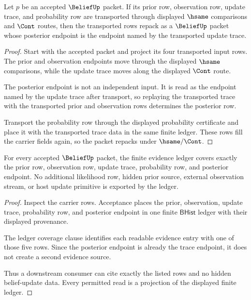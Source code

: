 \begin{theorem}
\label{thm:belief-posterior-trace-transport-obligation}
Let $p$ be an accepted $\BeliefUp$ packet. If its prior row, observation row,
update trace, and probability row are transported through displayed $\hsame$
comparisons and $\Cont$ routes, then the transported rows repack as a
$\BeliefUp$ packet whose posterior endpoint is the endpoint named by the
transported update trace.
\end{theorem}
\begin{proof}
Start with the accepted packet and project its four transported input rows. The
prior and observation endpoints move through the displayed $\hsame$ comparisons,
while the update trace moves along the displayed $\Cont$ route.

The posterior endpoint is not an independent input. It is read as the endpoint
named by the update trace after transport, so replaying the transported trace
with the transported prior and observation rows determines the posterior row.

Transport the probability row through the displayed probability certificate and
place it with the transported trace data in the same finite ledger. These rows
fill the carrier fields again, so the packet repacks under $\hsame/\Cont$.
\end{proof}

\begin{theorem}
\label{thm:belief-finite-evidence-ledger-coverage}
For every accepted $\BeliefUp$ packet, the finite evidence ledger covers exactly
the prior row, observation row, update trace, probability row, and posterior
endpoint. No additional likelihood row, hidden prior source, external
observation stream, or host update primitive is exported by the ledger.
\end{theorem}
\begin{proof}
Inspect the carrier rows. Acceptance places the prior, observation, update
trace, probability row, and posterior endpoint in one finite $\mathsf{BHist}$
ledger with their displayed provenance.

The ledger coverage clause identifies each readable evidence entry with one of
those five rows. Since the posterior endpoint is already the trace endpoint, it
does not create a second evidence source.

Thus a downstream consumer can cite exactly the listed rows and no hidden
belief-update data. Every permitted read is a projection of the displayed finite
ledger.
\end{proof}

